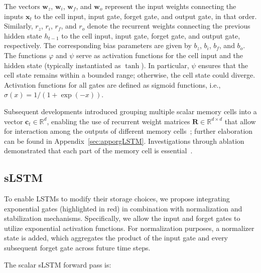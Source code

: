 The vectors $\mathbf{w}_{z}$, $\mathbf{w}_{i}$, $\mathbf{w}_{f}$, and $\mathbf{w}_{o}$ represent the input weights connecting the inputs $\mathbf{x}_t$ to the cell input, input gate, forget gate, and output gate, in that order. Similarly, $r_{z}$, $r_{i}$, $r_{f}$, and $r_{o}$ denote the recurrent weights connecting the previous hidden state $h_{t-1}$ to the cell input, input gate, forget gate, and output gate, respectively. The corresponding bias parameters are given by $b_{z}$, $b_{i}$, $b_{f}$, and $b_{o}$. The functions $\varphi$ and $\psi$ serve as activation functions for the cell input and the hidden state (typically instantiated as $\tanh$). In particular, $\psi$ ensures that the cell state remains within a bounded range; otherwise, the cell state could diverge. Activation functions for all gates are defined as sigmoid functions, i.e., $\sigma \left( x \right)= 1/(1+\exp(-x))$.

Subsequent developments introduced grouping multiple scalar memory cells into a vector $\mathbf{c}_t \in \mathbb{R}^d$, enabling the use of recurrent weight matrices $\mathbf{R} \in \mathbb{R}^{d \times d}$ that allow for interaction among the outputs of different memory cells~\citep{Greff:15}; further elaboration can be found in Appendix~\ref{sec:apporgLSTM}. Investigations through ablation demonstrated that each part of the memory cell is essential~\citep{Greff:15}.

\subsection{sLSTM}
\label{sec:sLSTM}

To enable LSTMs to modify their storage choices, we propose integrating exponential gates (highlighted in red) in combination with normalization and stabilization mechanisms. Specifically, we allow the input and forget gates to utilize exponential activation functions. For normalization purposes, a normalizer state is added, which aggregates the product of the input gate and every subsequent forget gate across future time steps.

The scalar sLSTM forward pass is:

